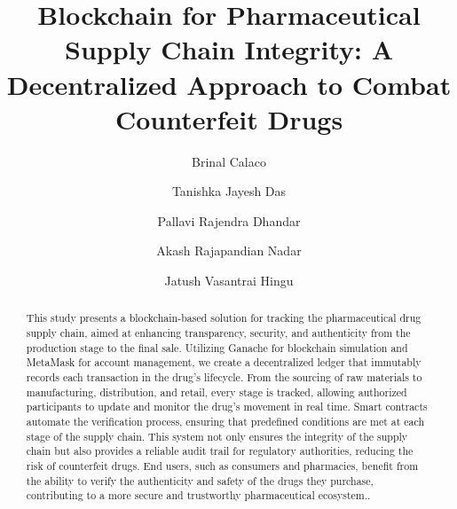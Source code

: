 \documentclass[runningheads]{llncs}
\begin{document}
%
\title{Blockchain for Pharmaceutical Supply Chain Integrity: A Decentralized Approach to Combat Counterfeit Drugs}
%
%
\author{
Brinal Calaco\and 
Tanishka Jayesh Das \and
Pallavi Rajendra Dhandar \and
Akash Rajapandian Nadar \and
Jatush Vasantrai Hingu
}
%


%
\maketitle              %
%
\begin{abstract}This study presents a blockchain-based 
solution for tracking the pharmaceutical drug supply chain, 
aimed at enhancing transparency, security, and authenticity 
from the production stage to the final sale. Utilizing Ganache 
for blockchain simulation and MetaMask for account 
management, we create a decentralized ledger that 
immutably records each transaction in the drug's lifecycle. 
From the sourcing of raw materials to manufacturing, 
distribution, and retail, every stage is tracked, allowing 
authorized participants to update and monitor the drug's 
movement in real time. Smart contracts automate the 
verification process, ensuring that predefined conditions are 
met at each stage of the supply chain. This system not only 
ensures the integrity of the supply chain but also provides a 
reliable audit trail for regulatory authorities, reducing the 
risk of counterfeit drugs. End users, such as consumers and 
pharmacies, benefit from the ability to verify the authenticity 
and safety of the drugs they purchase, contributing to a more 
secure and trustworthy pharmaceutical ecosystem..

\end{abstract}
\end{document}
